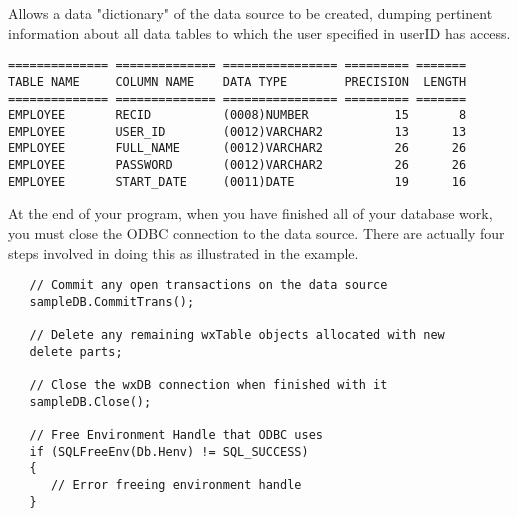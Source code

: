 



Allows a data "dictionary" of the data source to be created, dumping pertinent information about all data tables to which the user specified in userID has access. 

\begin{verbatim}
============== ============== ================ ========= =======
TABLE NAME     COLUMN NAME    DATA TYPE        PRECISION  LENGTH
============== ============== ================ ========= =======
EMPLOYEE       RECID          (0008)NUMBER            15       8
EMPLOYEE       USER_ID        (0012)VARCHAR2          13      13
EMPLOYEE       FULL_NAME      (0012)VARCHAR2          26      26
EMPLOYEE       PASSWORD       (0012)VARCHAR2          26      26
EMPLOYEE       START_DATE     (0011)DATE              19      16
\end{verbatim}





At the end of your program, when you have finished all of your database work, you must close the ODBC connection to the data source.  There are actually four steps involved in doing this as illustrated in the example.

\begin{verbatim}
   // Commit any open transactions on the data source
   sampleDB.CommitTrans();

   // Delete any remaining wxTable objects allocated with new
   delete parts;

   // Close the wxDB connection when finished with it
   sampleDB.Close();

   // Free Environment Handle that ODBC uses
   if (SQLFreeEnv(Db.Henv) != SQL_SUCCESS)
   {
      // Error freeing environment handle
   }
\end{verbatim}

